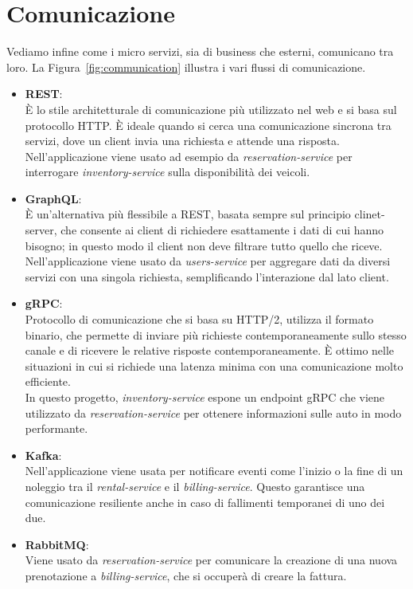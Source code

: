 \section{Comunicazione}
Vediamo infine come i micro servizi, sia di business che esterni, comunicano tra loro. La Figura~\ref{fig:communication} illustra i vari flussi di comunicazione.
\begin{itemize}
    \item \textbf{REST}: \\
        È lo stile architetturale di comunicazione più utilizzato nel web e si basa sul protocollo HTTP. È ideale quando si cerca una comunicazione sincrona tra servizi, dove un client invia una richiesta e attende una risposta. \\
        Nell'applicazione viene usato ad esempio da \textit{reservation-service} per interrogare \textit{inventory-service} sulla disponibilità dei veicoli.
    \item \textbf{GraphQL}: \\
        È un'alternativa più flessibile a REST, basata sempre sul principio clinet-server, che consente ai client di richiedere esattamente i dati di cui hanno bisogno; in questo modo il client non deve filtrare tutto quello che riceve. \\
        Nell'applicazione viene usato da \textit{users-service} per aggregare dati da diversi servizi con una singola richiesta, semplificando l'interazione dal lato client.
    \item \textbf{gRPC}: \\
        Protocollo di comunicazione che si basa su HTTP/2, utilizza il formato binario, che permette di inviare più richieste contemporaneamente sullo stesso canale e di ricevere le relative risposte contemporaneamente. È ottimo nelle situazioni in cui si richiede una latenza minima con una comunicazione molto efficiente. \\
        In questo progetto, \textit{inventory-service} espone un endpoint gRPC che viene utilizzato da \textit{reservation-service} per ottenere informazioni sulle auto in modo performante.
    \item \textbf{Kafka}: \\
        Nell'applicazione viene usata per notificare eventi come l'inizio o la fine di un noleggio tra il \textit{rental-service} e il \textit{billing-service}. Questo garantisce una comunicazione resiliente anche in caso di fallimenti temporanei di uno dei due.
    \item \textbf{RabbitMQ}: \\
        Viene usato da \textit{reservation-service} per comunicare la creazione di una nuova prenotazione a \textit{billing-service}, che si occuperà di creare la fattura.
\end{itemize}

